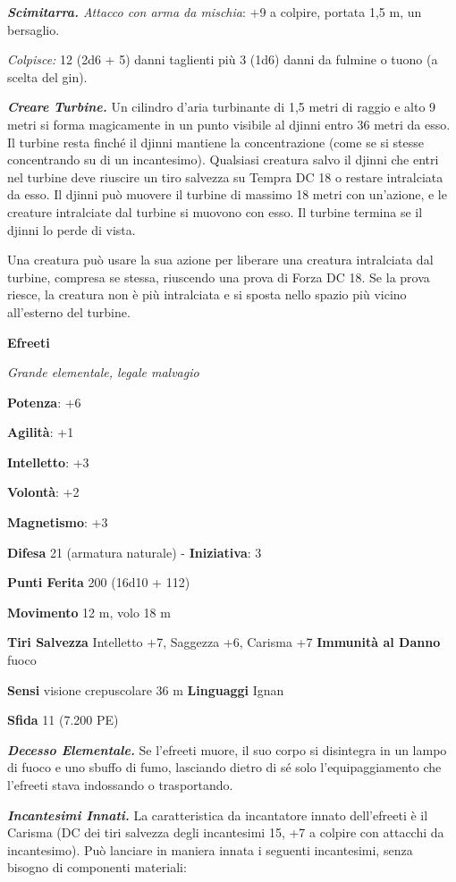\begin{multicols}{2}
\emph{\textbf{Scimitarra.} Attacco con arma da mischia}: +9 a colpire,
portata 1,5 m, un bersaglio.

\emph{Colpisce:} 12 (2d6 + 5) danni taglienti più 3 (1d6) danni da
fulmine o tuono (a scelta del gin).

\emph{\textbf{Creare Turbine.}} Un cilindro d'aria turbinante di 1,5
metri di raggio e alto 9 metri si forma magicamente in un punto visibile
al djinni entro 36 metri da esso. Il turbine resta finché il djinni
mantiene la concentrazione (come se si stesse concentrando su di un
incantesimo). Qualsiasi creatura salvo il djinni che entri nel turbine
deve riuscire un tiro salvezza su Tempra DC 18 o restare intralciata da
esso. Il djinni può muovere il turbine di massimo 18 metri con
un'azione, e le creature intralciate dal turbine si muovono con esso. Il
turbine termina se il djinni lo perde di vista.

Una creatura può usare la sua azione per liberare una creatura
intralciata dal turbine, compresa se stessa, riuscendo una prova di
Forza DC 18. Se la prova riesce, la creatura non è più intralciata e si
sposta nello spazio più vicino all'esterno del turbine.

\textbf{Efreeti}

\emph{Grande elementale, legale malvagio}

\textbf{Potenza}: +6

\textbf{Agilità}: +1

\textbf{Intelletto}: +3

\textbf{Volontà}: +2

\textbf{Magnetismo}: +3

\textbf{Difesa} 21 (armatura naturale) - \textbf{Iniziativa}: 3

\textbf{Punti Ferita} 200 (16d10 + 112) 

\textbf{Movimento} 12 m, volo 18 m

\textbf{Tiri Salvezza} Intelletto +7, Saggezza +6, Carisma +7
\textbf{Immunità al Danno} fuoco

\textbf{Sensi} visione crepuscolare 36 m
\textbf{Linguaggi} Ignan

\textbf{Sfida} 11 (7.200 PE)

\emph{\textbf{Decesso Elementale.}} Se l'efreeti muore, il suo corpo si
disintegra in un lampo di fuoco e uno sbuffo di fumo, lasciando dietro
di sé solo l'equipaggiamento che l'efreeti stava indossando o
trasportando.

\emph{\textbf{Incantesimi Innati.}} La caratteristica da incantatore
innato dell'efreeti è il Carisma (DC dei tiri salvezza degli incantesimi
15, +7 a colpire con attacchi da incantesimo). Può lanciare in maniera
innata i seguenti incantesimi, senza bisogno di componenti materiali:


\end{multicols}
